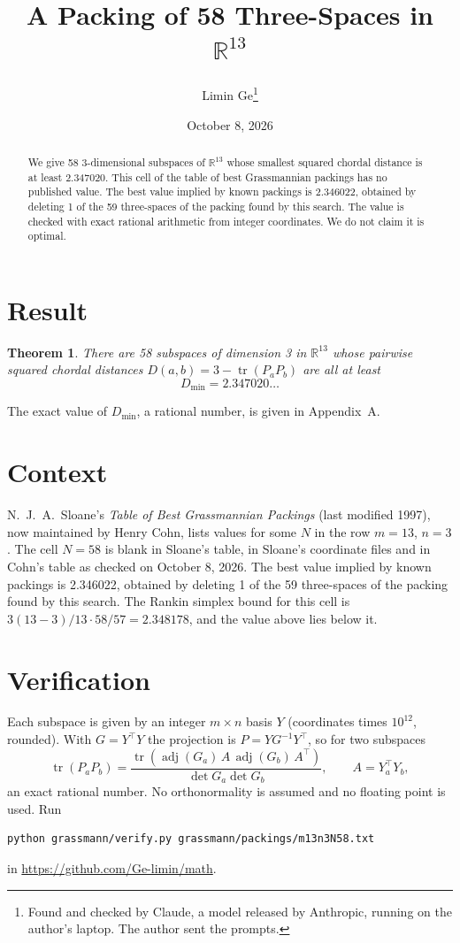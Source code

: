 \documentclass[11pt,a4paper]{article}
\title{A Packing of 58 Three-Spaces in $\mathbb{R}^{13}$}
\author{Limin Ge\thanks{Found and checked by Claude, a model released by Anthropic, running on the author's laptop. The author sent the prompts.}}
\date{October 8, 2026}
\newtheorem*{theorem}{Theorem}
\begin{document}
\maketitle
\begin{abstract}
We give 58 3-dimensional subspaces of $\mathbb{R}^{13}$ whose smallest squared chordal distance is at least 2.347020. This cell of the table of best Grassmannian packings has no published value. The best value implied by known packings is 2.346022, obtained by deleting 1 of the 59 three-spaces of the packing found by this search. The value is checked with exact rational arithmetic from integer coordinates. We do not claim it is optimal.
\end{abstract}

\section{Result}
\begin{theorem}
There are 58 subspaces of dimension 3 in $\mathbb{R}^{13}$ whose pairwise squared chordal distances $D(a,b) = 3 - \operatorname{tr}(P_aP_b)$ are all at least
\[ D_{\min} = 2.347020\ldots \]
\end{theorem}
The exact value of $D_{\min}$, a rational number, is given in Appendix~A.


\section{Context}
N.~J.~A.~Sloane's \emph{Table of Best Grassmannian Packings} (last modified 1997), now maintained by Henry Cohn, lists values for some $N$ in the row $m=13$, $n=3$. The cell $N=58$ is blank in Sloane's table, in Sloane's coordinate files and in Cohn's table as checked on October 8, 2026. The best value implied by known packings is 2.346022, obtained by deleting 1 of the 59 three-spaces of the packing found by this search. The Rankin simplex bound for this cell is $3(13-3)/13\cdot 58/57 = 2.348178$, and the value above lies below it.


\section{Verification}
Each subspace is given by an integer $m\times n$ basis $Y$ (coordinates times $10^{12}$, rounded). With $G=Y^\top Y$ the projection is $P=YG^{-1}Y^\top$, so for two subspaces
\[ \operatorname{tr}(P_aP_b)=\frac{\operatorname{tr}(\operatorname{adj}(G_a)\,A\,\operatorname{adj}(G_b)\,A^\top)}{\det G_a\det G_b},\qquad A=Y_a^\top Y_b, \]
an exact rational number. No orthonormality is assumed and no floating point is used. Run
\begin{verbatim}
python grassmann/verify.py grassmann/packings/m13n3N58.txt
\end{verbatim}
in \url{https://github.com/Ge-limin/math}.
\end{document}
